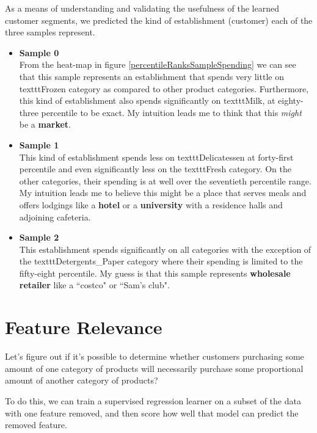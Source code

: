 \documentclass[twoside,openright,titlepage,numbers=noenddot,headinclude,%
               footinclude=true,cleardoublepage=empty,abstractoff,BCOR=5mm,%
               paper=a4,fontsize=11pt,ngerman,american]{scrreprt}
\numberwithin{theorem}{chapter}
\numberwithin{definition}{chapter}
\numberwithin{algorithm}{chapter}
\numberwithin{figure}{chapter}
\numberwithin{table}{chapter}
\numberwithin{equation}{chapter}
\begin{document}
As a means of understanding and validating the usefulness of the learned customer segments, we predicted the kind of establishment (customer) each of the three samples represent.

\begin{itemize}
\item \textbf{Sample 0} \\

From the heat-map in figure \ref{percentileRanksSampleSpending} we can see that this sample represents an establishment that spends very little on texttt{Frozen} category as compared to other product categories. Furthermore, this kind of establishment also spends significantly on texttt{Milk}, at eighty-three percentile to be exact. My intuition leads me to think that this \emph{might} be a \textbf{market}. 

\item \textbf{Sample 1} \\ 
This kind of establishment spends less on texttt{Delicatessen} at forty-first percentile and even significantly less on the texttt{Fresh} category. On the other categories, their spending is at well over the seventieth percentile range. My intuition leads me to believe this might be a place that serves meals and offers lodgings like a \textbf{hotel} or a \textbf{university} with a residence halls and adjoining cafeteria. 

\item \textbf{Sample 2} \\
This establishment spends significantly on all categories with the exception of the texttt{Detergents\_Paper} category where their spending is limited to the fifty-eight percentile. My guess is that this sample represents \textbf{wholesale retailer} like a ``costco" or ``Sam's club".

\end{itemize}



\section*{Feature Relevance}
Let's figure out if it's possible to determine whether customers purchasing some amount of one category of products will necessarily purchase some proportional amount of another category of products? 

To do this, we can train a supervised regression learner on a subset of the data with one feature removed, and then score how well that model can predict the removed feature.
\end{document}
